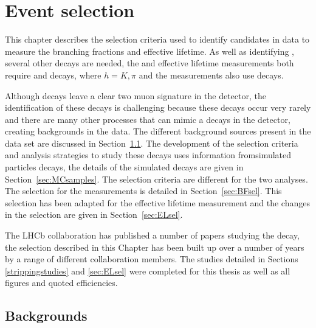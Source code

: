 \chapter{Event selection}
\label{selection_chapter}

This chapter describes the selection criteria used to identify \bmumu candidates in data to measure the \bmumu branching fractions and \bsmumu effective lifetime. As well as identifying \bmumu, several other decays are needed, %
the \BF and effective lifetime measurements both require \bsjpsiphi and \bhh decays, where $h = K, \pi$ and the \BF measurements also use \bujpsik decays.  

Although \bsmumu decays leave a clear two muon signature in the detector, the identification of these decays is challenging because these decays occur very rarely and there are many other processes that can mimic a \bmumu decays in the detector, creating backgrounds in the data. The different background sources present in the data set are discussed in Section~\ref{sec:backgroundoutline}. The development of the selection criteria and analysis strategies to study these decays uses information fromsimulated particles decays, the details of the simulated decays are given in Section~\ref{sec:MCsamples}. 
The selection criteria are different for the two analyses. The selection for the \BF measurements %
is detailed in Section~\ref{sec:BFsel}. This selection has been adapted for the effective lifetime measurement and the changes in the selection are given in Section~\ref{sec:ELsel}.


The LHCb collaboration has published a number of papers studying the \bsmumu decay, the selection described in this Chapter has been built up over a number of years by a range of different collaboration members. The studies detailed in Sections \ref{strippingstudies} and \ref{sec:ELsel} were completed for this thesis as well as all figures and quoted efficiencies.

\section{Backgrounds}
\label{sec:backgroundoutline}

